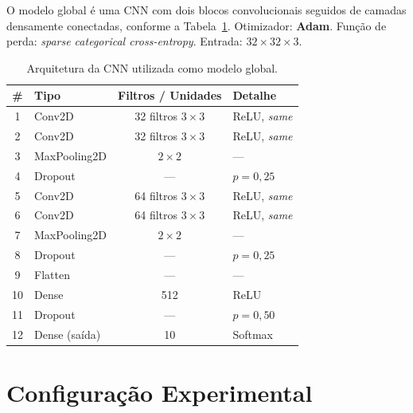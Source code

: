 \documentclass[12pt, a4paper]{article}
\begin{document}
O modelo global é uma CNN com dois blocos convolucionais seguidos de
camadas densamente conectadas, conforme a Tabela~\ref{tab:model}.
Otimizador: \textbf{Adam}. Função de perda: \textit{sparse categorical cross-entropy}.
Entrada: $32 \times 32 \times 3$.

\begin{table}[H]
\centering
\caption{Arquitetura da CNN utilizada como modelo global.}
\label{tab:model}
\renewcommand{\arraystretch}{1.25}
\begin{tabular}{clcl}
\toprule
\textbf{\#} & \textbf{Tipo} & \textbf{Filtros / Unidades} & \textbf{Detalhe} \\
\midrule
1  & Conv2D        & 32 filtros $3\!\times\!3$ & ReLU, \textit{same} \\
2  & Conv2D        & 32 filtros $3\!\times\!3$ & ReLU, \textit{same} \\
3  & MaxPooling2D  & $2\!\times\!2$            & —                   \\
4  & Dropout       & —                         & $p = 0{,}25$        \\
5  & Conv2D        & 64 filtros $3\!\times\!3$ & ReLU, \textit{same} \\
6  & Conv2D        & 64 filtros $3\!\times\!3$ & ReLU, \textit{same} \\
7  & MaxPooling2D  & $2\!\times\!2$            & —                   \\
8  & Dropout       & —                         & $p = 0{,}25$        \\
9  & Flatten       & —                         & —                   \\
10 & Dense         & 512                       & ReLU                \\
11 & Dropout       & —                         & $p = 0{,}50$        \\
12 & Dense (saída) & 10                        & Softmax             \\
\bottomrule
\end{tabular}
\end{table}

\section{Configuração Experimental}
\end{document}
